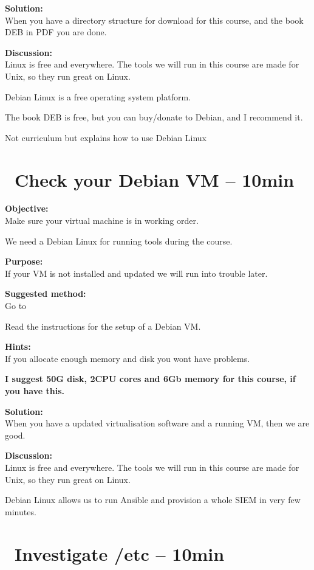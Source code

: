 \documentclass[a4paper,11pt,notitlepage]{report}
\begin{document}
{\bf Solution:}\\
When you have a directory structure for download for this course, and the book DEB in PDF you are done.

{\bf Discussion:}\\
Linux is free and everywhere. The tools we will run in this course are made for Unix, so they run great on Linux.

Debian Linux is a free operating system platform.

The book DEB is free, but you can buy/donate to Debian, and I recommend it.

Not curriculum but explains how to use Debian Linux


\chapter{\faExclamationTriangle\ Check your Debian VM -- 10min}
\label{ex:sw-basicDebianVM}


{\bf Objective:}\\
Make sure your virtual machine is in working order.

We need a Debian Linux for running tools during the course.

{\bf Purpose:}\\
If your VM is not installed and updated we will run into trouble later.

{\bf Suggested method:}\\
Go to 

Read the instructions for the setup of a Debian VM.


{\bf Hints:}\\
If you allocate enough memory and disk you wont have problems.

{\bf I suggest 50G disk, 2CPU cores and 6Gb memory for this course, if you have this.}

{\bf Solution:}\\
When you have a updated virtualisation software and a running VM, then we are good.

{\bf Discussion:}\\
Linux is free and everywhere. The tools we will run in this course are made for Unix, so they run great on Linux.

Debian Linux allows us to run Ansible and provision a whole SIEM in very few minutes.


\chapter{\faInfoCircle\ Investigate /etc -- 10min}
\label{ex:sw-basicLinuxetc}
\end{document}
